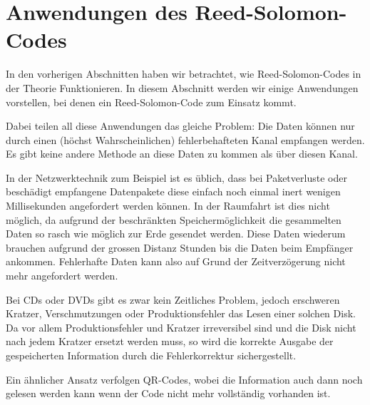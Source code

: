 %
%
%
\section{Anwendungen des Reed-Solomon-Codes
	\label{reedsolomon:section:anwendung}}

In den vorherigen Abschnitten haben wir betrachtet, wie Reed-Solomon-Codes in der Theorie Funktionieren. 
In diesem Abschnitt werden wir einige Anwendungen vorstellen, bei denen ein Reed-Solomon-Code zum Einsatz kommt.

Dabei teilen all diese Anwendungen das gleiche Problem: Die Daten können nur durch einen (höchst Wahrscheinlichen) fehlerbehafteten Kanal empfangen werden. Es gibt keine andere Methode an diese Daten zu kommen als über diesen Kanal.


In der Netzwerktechnik zum Beispiel ist es üblich, dass bei Paketverluste oder beschädigt empfangene Datenpakete diese einfach noch einmal inert wenigen Millisekunden angefordert werden können.
In der Raumfahrt ist dies nicht möglich, da aufgrund der beschränkten Speichermöglichkeit die gesammelten Daten so rasch wie möglich zur Erde gesendet werden. 
Diese Daten wiederum brauchen aufgrund der grossen Distanz Stunden bis die Daten beim Empfänger ankommen.
Fehlerhafte Daten kann also auf Grund der Zeitverzögerung nicht mehr angefordert werden. 

Bei CDs oder DVDs gibt es zwar kein Zeitliches Problem, jedoch erschweren Kratzer, Verschmutzungen oder Produktionsfehler das Lesen einer solchen Disk.
Da vor allem Produktionsfehler und Kratzer irreversibel sind und die Disk nicht nach jedem Kratzer ersetzt werden muss, so wird die korrekte Ausgabe der gespeicherten Information durch die Fehlerkorrektur sichergestellt. 

Ein ähnlicher Ansatz verfolgen QR-Codes, wobei die Information auch dann noch gelesen werden kann wenn der Code nicht mehr vollständig vorhanden ist. 

%
%
%
%
%


